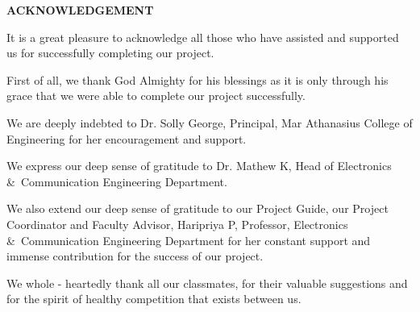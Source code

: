\documentclass[12pt,a4paper]{report}
\begin{document}
\newpage
{}
\setcounter{page}{1}
\begin{verbatim}
\end{verbatim}
\begin{center}
\textbf {\large ACKNOWLEDGEMENT}
\end{center}
\vspace{0.4125in}
\par
It is a great pleasure to acknowledge all those who have assisted and supported us for successfully completing our project.
\\
\par 
First of all, we thank God Almighty for his blessings as it is only through his grace that we were able to complete our project successfully.
\\
\par 
We are deeply indebted to Dr. Solly George, Principal, Mar Athanasius College of Engineering for her encouragement and support.
\\
\par
We express our deep sense of gratitude to Dr. Mathew K, Head of Electronics \&\  Communication Engineering Department.
\\
\par
We also extend our deep sense of gratitude to our Project Guide, our Project Coordinator and Faculty Advisor, Haripriya P, Professor, Electronics \&\  Communication Engineering Department for her constant support and immense contribution for the success of our project.
\\
\par
 We whole - heartedly thank all our classmates, for their valuable suggestions and for the spirit of healthy competition that exists between us. 
 
 
\end{document}
